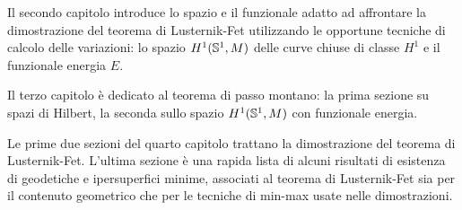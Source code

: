 Il secondo capitolo introduce lo spazio e il funzionale adatto ad affrontare la dimostrazione del teorema di Lusternik-Fet utilizzando le opportune tecniche di calcolo delle variazioni: lo spazio \(H^1(\mathbb{S}^1,M)\) delle curve chiuse di classe \(H^1\) e il funzionale energia \(E\).

Il terzo capitolo è dedicato al teorema di passo montano: la prima sezione su spazi di Hilbert, la seconda sullo spazio \(H^1(\mathbb{S}^1,M)\) con funzionale energia. 

Le prime due sezioni del quarto capitolo trattano la dimostrazione del teorema di Lusternik-Fet. L'ultima sezione è una rapida lista di alcuni risultati di esistenza di geodetiche e ipersuperfici minime, associati al teorema di Lusternik-Fet sia per il contenuto geometrico che per le tecniche di min-max usate nelle dimostrazioni.